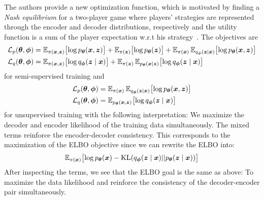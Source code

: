 The authors provide a new optimization function, which is motivated by finding a \textit{Nash equilibrium} for a two-player game 
where players' strategies are represented through the encoder and decoder distributions, respectively and the utility function is
a sum of the player expectation w.r.t his strategy~\cite{sym-learning-2023}. 
The objectives are 
\begin{align*}
    \mathcal{L}_{p}(\boldsymbol{\theta},\boldsymbol{\phi}) &= \operatorname{\mathbb{E}}_{\pi(\boldsymbol{x},\boldsymbol{z})}\bigl[\log p_{\boldsymbol{\theta}}(\boldsymbol{x},\boldsymbol{z})\bigr]+
                    \operatorname{\mathbb{E}}_{\pi(\boldsymbol{z})}\bigl[\log p_{\boldsymbol{\theta}}(\boldsymbol{z})\bigr] +
                    \operatorname{\mathbb{E}}_{\pi(\boldsymbol{x})}\operatorname{\mathbb{E}}_{q_{\boldsymbol{\phi}}(\boldsymbol{z} \mid\boldsymbol{x})}\bigl[\log p_{\boldsymbol{\theta}}(\boldsymbol{x},\boldsymbol{z})\bigr]\\
    \mathcal{L}_{q}(\boldsymbol{\theta},\boldsymbol{\phi}) &= \operatorname{\mathbb{E}}_{\pi(\boldsymbol{x},\boldsymbol{z})}\bigl[\log q_{\boldsymbol{\phi}}(\boldsymbol{z} \mid \boldsymbol{x})\bigr] + 
    \operatorname{\mathbb{E}}_{\pi(\boldsymbol{z})}\operatorname{\mathbb{E}}_{p_{\boldsymbol{\theta}}(\boldsymbol{x} \mid\boldsymbol{z})} \bigl[\log q_{\boldsymbol{\phi}}(\boldsymbol{z} \mid \boldsymbol{x})\bigr]
\end{align*}
for semi-supervised training and 
\begin{align}
    \mathcal{L}_{p}(\boldsymbol{\theta},\boldsymbol{\phi}) &= \operatorname{\mathbb{E}}_{\pi(\boldsymbol{x})}\operatorname{\mathbb{E}}_{q_{\boldsymbol{\phi}}(\boldsymbol{z} \mid\boldsymbol{x})}\bigl[\log p_{\boldsymbol{\theta}}(\boldsymbol{x},\boldsymbol{z})\bigr] \label{eq:unsup_objective_theta}\\
    \mathcal{L}_{q}(\boldsymbol{\theta},\boldsymbol{\phi}) &= \operatorname{\mathbb{E}}_{p_{\boldsymbol{\theta}}(\boldsymbol{x},\boldsymbol{z})} \bigl[\log q_{\boldsymbol{\phi}}(\boldsymbol{z} \mid \boldsymbol{x})\bigr] \label{eq:unsup_objective_phi}
\end{align}
for unsupervised training with the following interpretation: We maximize the decoder and encoder likelihood of the training data simultaneously. 
The mixed terms reinforce the encoder-decoder consistency. This corresponds to the maximization of the ELBO objective since we can 
rewrite the ELBO into:
$$
\operatorname{\mathbb{E}}_{\pi(\boldsymbol{x})} \bigl[ 
\log p_{\boldsymbol{\theta}}(\boldsymbol{x}) - \mathrm{KL} (q_{\boldsymbol{\phi}}(\boldsymbol{z} \mid \boldsymbol{x}) || 
p_{\boldsymbol{\theta}}(\boldsymbol{z} \mid \boldsymbol{x})) \bigr]
$$
After inspecting the terms, we see that the ELBO goal is the same as above: To maximize the data likelihood and reinforce the consistency of the decoder-encoder pair 
simultaneously. 
